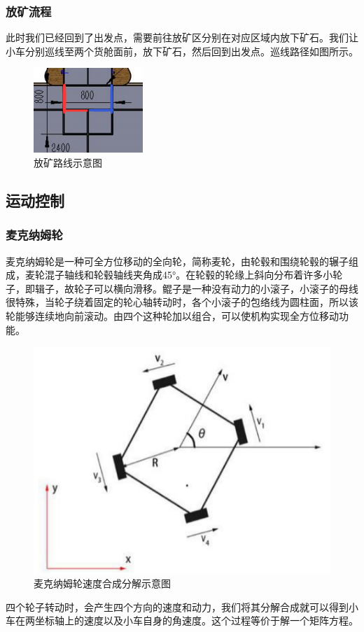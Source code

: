 \documentclass[10pt]{ctexart}
\begin{document}
\subsubsection{放矿流程}
此时我们已经回到了出发点，需要前往放矿区分别在对应区域内放下矿石。我们让小车分别巡线至两个货舱面前，放下矿石，然后回到出发点。巡线路径如图所示。

\begin{figure}[H]
    \centering
    \includegraphics{algo/way_putdown.png}
    \caption{放矿路线示意图}
    \label{fig:way_putdown}
\end{figure}

\subsection{运动控制}
\subsubsection{麦克纳姆轮}
麦克纳姆轮是一种可全方位移动的全向轮，简称麦轮，由轮毂和围绕轮毂的辗子组成，麦轮混子轴线和轮毂轴线夹角成45°。在轮毂的轮缘上斜向分布着许多小轮子，即辑子，故轮子可以横向滑移。鲲子是一种没有动力的小滚子，小滚子的母线很特殊，当轮子绕着固定的轮心轴转动时，各个小滚子的包络线为圆柱面，所以该轮能够连续地向前滚动。由四个这种轮加以组合，可以使机构实现全方位移动功能。
\begin{figure}[H]
    \centering
    \includegraphics{algo/Mwheel.png}
    \caption{麦克纳姆轮速度合成分解示意图}
    \label{fig:Mwheel}
\end{figure}
四个轮子转动时，会产生四个方向的速度和动力，我们将其分解合成就可以得到小车在两坐标轴上的速度以及小车自身的角速度。这个过程等价于解一个矩阵方程。
\end{document}
